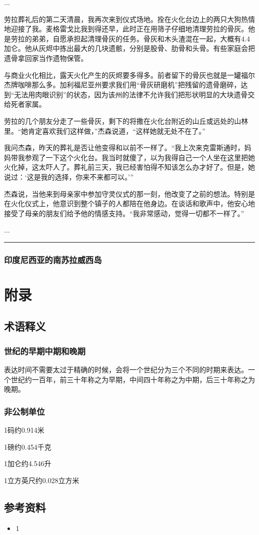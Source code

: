 \documentclass[12pt,oneside]{book}
\newcommand\hr{\par\noindent\hrule}
\begin{document}
...

劳拉葬礼后的第二天清晨，我再次来到仪式场地。拴在火化台边上的两只大狗热情地迎接了我。麦格雷戈比我到得还早，此时正在用筛子仔细地清理劳拉的骨灰。他是劳拉的弟弟，自愿承担起清理骨灰的任务。骨灰和木头渣混在一起，大概有4.4加仑。他从灰烬中拣出最大的几块遗骸，分别是股骨、肋骨和头骨。有些家庭会把遗骨拿回家当作遗物保管。

与商业火化相比，露天火化产生的灰烬要多得多。前者留下的骨灰也就是一罐福尔杰牌咖啡那么多。加利福尼亚州要求我们用“骨灰研磨机”把残留的遗骨磨碎，达到“无法用肉眼识别”的状态，因为该州的法律不允许我们把形状明显的大块遗骨交给死者家属。

劳拉的几个朋友分走了一些骨灰，剩下的将撒在火化台附近的山丘或远处的山林里。“她肯定喜欢我们这样做，”杰森说道，“这样她就无处不在了。”

我问杰森，昨天的葬礼是否让他变得和以前不一样了。“我上次来克雷斯通时，妈妈带我参观了一下这个火化台。我当时就傻了，以为我得自己一个人坐在这里把她火化掉，这太吓人了。葬礼前三天，我已经害怕得不知该怎么办才好了。但是，她说过：‘这是我的选择，你来不来都可以。’”

杰森说，当他来到母亲家中参加守灵仪式的那一刻，他改变了之前的想法。特别是在火化仪式上，他意识到整个镇子的人都陪在他身边。在谈话和歌声中，他安心地接受了母亲的朋友们给予他的情感支持。“我非常感动，觉得一切都不一样了。”

...

\hr

\section{印度尼西亚的南苏拉威西岛}



\part{附录}
\chapter{术语释义}
\section{世纪的早期中期和晚期}
表达时间不需要太过于精确的时候，会将一个世纪分为三个不同的时期来表达。一个世纪约一百年，前三十年称之为早期，中间四十年称之为中期，后三十年称之为晚期。

\section{非公制单位}
1码约0.914米

1磅约0.454千克

1加仑约4.546升

1立方英尺约0.028立方米


\chapter{参考资料}
\begin{itemize}
\item 1
\end{itemize}

\end{document}
